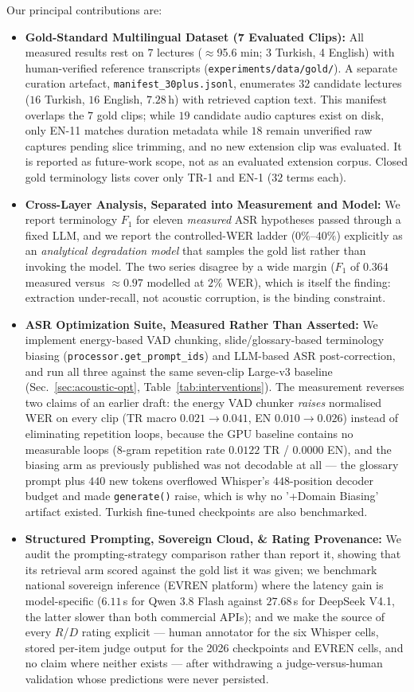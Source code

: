 \documentclass[conference]{IEEEtran}
\begin{document}
Our principal contributions are:

\begin{itemize}
\item \textbf{Gold-Standard Multilingual Dataset (7 Evaluated Clips):} All measured results rest on $7$ lectures ($\approx$95.6 min; 3 Turkish, 4 English) with human-verified reference transcripts (\texttt{experiments/data/gold/}). A separate curation artefact, \texttt{manifest\_30plus.jsonl}, enumerates $32$ candidate lectures ($16$ Turkish, $16$ English, $7.28$\,h) with retrieved caption text. This manifest overlaps the $7$ gold clips; while $19$ candidate audio captures exist on disk, only EN-11 matches duration metadata while $18$ remain unverified raw captures pending slice trimming, and no new extension clip was evaluated. It is reported as future-work scope, not as an evaluated extension corpus. Closed gold terminology lists cover only TR-1 and EN-1 ($32$ terms each).
\item \textbf{Cross-Layer Analysis, Separated into Measurement and Model:} We report terminology $F_1$ for eleven \emph{measured} ASR hypotheses passed through a fixed LLM, and we report the controlled-WER ladder ($0\%$--$40\%$) explicitly as an \emph{analytical degradation model} that samples the gold list rather than invoking the model. The two series disagree by a wide margin ($F_1$ of $0.364$ measured versus $\approx0.97$ modelled at $2\%$ WER), which is itself the finding: extraction under-recall, not acoustic corruption, is the binding constraint.
\item \textbf{ASR Optimization Suite, Measured Rather Than Asserted:} We implement energy-based VAD chunking, slide/glossary-based terminology biasing (\texttt{processor.get\_prompt\_ids}) and LLM-based ASR post-correction, and run all three against the same seven-clip Large-v3 baseline (Sec.~\ref{sec:acoustic-opt}, Table~\ref{tab:interventions}). The measurement reverses two claims of an earlier draft: the energy VAD chunker \emph{raises} normalised WER on every clip (TR macro $0.021 \rightarrow 0.041$, EN $0.010 \rightarrow 0.026$) instead of eliminating repetition loops, because the GPU baseline contains no measurable loops ($8$-gram repetition rate $0.0122$ TR / $0.0000$ EN), and the biasing arm as previously published was not decodable at all --- the glossary prompt plus $440$ new tokens overflowed Whisper's $448$-position decoder budget and made \texttt{generate()} raise, which is why no '+Domain Biasing' artifact existed. Turkish fine-tuned checkpoints are also benchmarked.
\item \textbf{Structured Prompting, Sovereign Cloud, \& Rating Provenance:} We audit the prompting-strategy comparison rather than report it, showing that its retrieval arm scored against the gold list it was given; we benchmark national sovereign inference (EVREN platform) where the latency gain is model-specific ($6.11$\,s for Qwen 3.8 Flash against $27.68$\,s for DeepSeek V4.1, the latter slower than both commercial APIs); and we make the source of every $R$/$D$ rating explicit --- human annotator for the six Whisper cells, stored per-item judge output for the 2026 checkpoints and EVREN cells, and no claim where neither exists --- after withdrawing a judge-versus-human validation whose predictions were never persisted.

\end{itemize}
\end{document}
